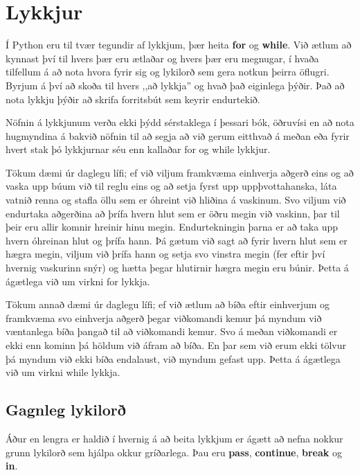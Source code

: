 
\chapter{Lykkjur}\label{k:lykkjur}

Í Python eru til tvær tegundir af lykkjum, þær heita \textbf{for} og \textbf{while}.
Við ætlum að kynnast því til hvers þær eru ætlaðar og hvers þær eru megnugar, í hvaða tilfellum á að nota hvora fyrir sig og lykilorð sem gera notkun þeirra öflugri.
Byrjum á því að skoða til hvers ,,að lykkja'' og hvað það eiginlega þýðir.
Það að nota lykkju þýðir að skrifa forritsbút sem keyrir endurtekið.

Nöfnin á lykkjunum verða ekki þýdd sérstaklega í þessari bók, öðruvísi en að nota hugmyndina á bakvið nöfnin til að segja að við gerum eitthvað á meðan eða fyrir hvert stak þó lykkjurnar séu enn kallaðar for og while lykkjur.

Tökum dæmi úr daglegu lífi; ef við viljum framkvæma einhverja aðgerð eins og að vaska upp búum við til reglu eins og að setja fyrst upp uppþvottahanska, láta vatnið renna og stafla öllu sem er óhreint við hliðina á vaskinum. 
Svo viljum við endurtaka aðgerðina að þrífa hvern hlut sem er öðru megin við vaskinn, þar til þeir eru allir komnir hreinir hinu megin.
Endurtekningin þarna er að taka upp hvern óhreinan hlut og þrífa hann.
Þá gætum við sagt að fyrir hvern hlut sem er hægra megin, viljum við þrífa hann og setja svo vinstra megin (fer eftir því hvernig vaskurinn snýr) og hætta þegar hlutirnir hægra megin eru búnir.
Þetta á ágætlega við um virkni for lykkja.

Tökum annað dæmi úr daglegu lífi; ef við ætlum að bíða eftir einhverjum og framkvæma svo einhverja aðgerð þegar viðkomandi kemur þá myndum við væntanlega bíða þangað til að viðkomandi kemur.
Svo á meðan viðkomandi er ekki enn kominn þá höldum við áfram að bíða.
En þar sem við erum ekki tölvur þá myndum við ekki bíða endalaust, við myndum gefast upp.
Þetta á ágætlega við um virkni while lykkja.

\section{Gagnleg lykilorð}\label{uk:lykkjulykilorð}
Áður en lengra er haldið í hvernig á að beita lykkjum er ágætt að nefna nokkur grunn lykilorð sem hjálpa okkur gríðarlega.
Þau eru \textbf{pass}, \textbf{continue}, \textbf{break} og \textbf{in}.

